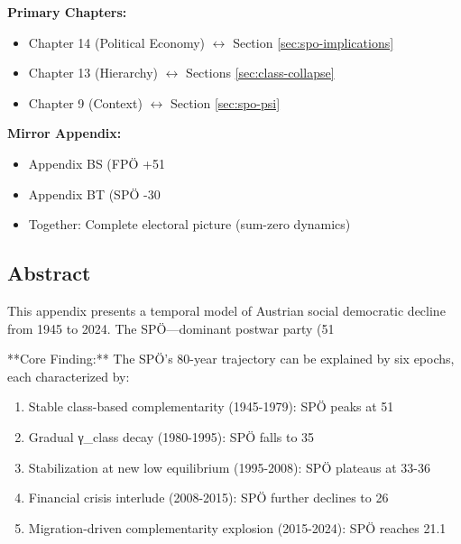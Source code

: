 \begin{tcolorbox}[colback=red!5!white, colframe=red!75!black,
    title=Chapter Linkage]

\textbf{Primary Chapters:}
\begin{itemize}[nosep]
\item Chapter 14 (Political Economy) $\leftrightarrow$ Section \ref{sec:spo-implications}
\item Chapter 13 (Hierarchy) $\leftrightarrow$ Sections \ref{sec:class-collapse}
\item Chapter 9 (Context) $\leftrightarrow$ Section \ref{sec:spo-psi}
\end{itemize}

\textbf{Mirror Appendix:}
\begin{itemize}[nosep]
\item Appendix BS (FPÖ +51%
\item Appendix BT (SPÖ -30%
\item Together: Complete electoral picture (sum-zero dynamics)
\end{itemize}

\end{tcolorbox}

\clearpage


\subsection*{Abstract}

This appendix presents a temporal model of Austrian social democratic decline from 1945 to 2024. The SPÖ—dominant postwar party (51%

**Core Finding:** The SPÖ's 80-year trajectory can be explained by six epochs, each characterized by:

\begin{enumerate}
\item Stable class-based complementarity (1945-1979): SPÖ peaks at 51%
\item Gradual γ_class decay (1980-1995): SPÖ falls to 35%
\item Stabilization at new low equilibrium (1995-2008): SPÖ plateaus at 33-36%
\item Financial crisis interlude (2008-2015): SPÖ further declines to 26%
\item Migration-driven complementarity explosion (2015-2024): SPÖ reaches 21.1%
\end{enumerate}


